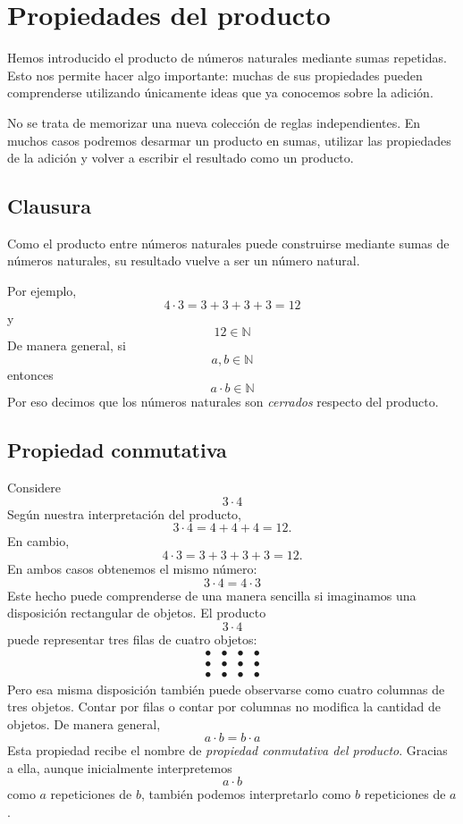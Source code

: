 \section{Propiedades del producto}

Hemos introducido el producto de números naturales mediante sumas repetidas. Esto nos permite hacer algo importante: muchas de sus propiedades pueden comprenderse utilizando únicamente ideas que ya conocemos sobre la adición.

No se trata de memorizar una nueva colección de reglas independientes. En muchos casos podremos desarmar un producto en sumas, utilizar las propiedades de la adición y volver a escribir el resultado como un producto.

\subsection{Clausura}

Como el producto entre números naturales puede construirse mediante sumas de números naturales, su resultado vuelve a ser un número natural.

Por ejemplo,
\[
4\cdot3
=
3+3+3+3
=
12
\]
y
\[
12\in\mathbb{N}
\]
De manera general, si
\[
a,b\in\mathbb{N}
\]
entonces
\[
a\cdot b\in\mathbb{N}
\]
Por eso decimos que los números naturales son \emph{cerrados} respecto del producto.

\subsection{Propiedad conmutativa}

Considere
\[
3\cdot4
\]
Según nuestra interpretación del producto,
\[
3\cdot4
=
4+4+4
=
12.
\]
En cambio,
\[
4\cdot3
=
3+3+3+3
=
12.
\]
En ambos casos obtenemos el mismo número:
\[
3\cdot4=4\cdot3
\]
Este hecho puede comprenderse de una manera sencilla si imaginamos una disposición rectangular de objetos. El producto
\[
3\cdot4
\]
puede representar tres filas de cuatro objetos:
\[
\begin{array}{cccc}
\bullet&\bullet&\bullet&\bullet\\
\bullet&\bullet&\bullet&\bullet\\
\bullet&\bullet&\bullet&\bullet
\end{array}
\]
Pero esa misma disposición también puede observarse como cuatro columnas de tres objetos. Contar por filas o contar por columnas no modifica la cantidad de objetos.
De manera general,
\[
a\cdot b=b\cdot a
\]
Esta propiedad recibe el nombre de \emph{propiedad conmutativa del producto}.
Gracias a ella, aunque inicialmente interpretemos
\[
a\cdot b
\]
como \(a\) repeticiones de \(b\), también podemos interpretarlo como \(b\) repeticiones de \(a\).


